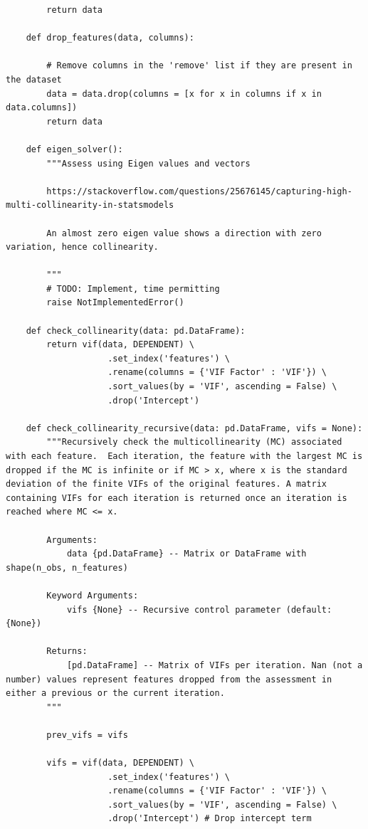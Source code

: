 \begin{verbatim}
        return data

    def drop_features(data, columns):

        # Remove columns in the 'remove' list if they are present in the dataset
        data = data.drop(columns = [x for x in columns if x in data.columns])
        return data

    def eigen_solver():
        """Assess using Eigen values and vectors

        https://stackoverflow.com/questions/25676145/capturing-high-multi-collinearity-in-statsmodels

        An almost zero eigen value shows a direction with zero variation, hence collinearity.

        """
        # TODO: Implement, time permitting
        raise NotImplementedError()

    def check_collinearity(data: pd.DataFrame):
        return vif(data, DEPENDENT) \
                    .set_index('features') \
                    .rename(columns = {'VIF Factor' : 'VIF'}) \
                    .sort_values(by = 'VIF', ascending = False) \
                    .drop('Intercept')

    def check_collinearity_recursive(data: pd.DataFrame, vifs = None):
        """Recursively check the multicollinearity (MC) associated with each feature.  Each iteration, the feature with the largest MC is dropped if the MC is infinite or if MC > x, where x is the standard deviation of the finite VIFs of the original features. A matrix containing VIFs for each iteration is returned once an iteration is reached where MC <= x.

        Arguments:
            data {pd.DataFrame} -- Matrix or DataFrame with shape(n_obs, n_features)

        Keyword Arguments:
            vifs {None} -- Recursive control parameter (default: {None})

        Returns:
            [pd.DataFrame] -- Matrix of VIFs per iteration. Nan (not a number) values represent features dropped from the assessment in either a previous or the current iteration.
        """

        prev_vifs = vifs

        vifs = vif(data, DEPENDENT) \
                    .set_index('features') \
                    .rename(columns = {'VIF Factor' : 'VIF'}) \
                    .sort_values(by = 'VIF', ascending = False) \
                    .drop('Intercept') # Drop intercept term



\end{verbatim}
